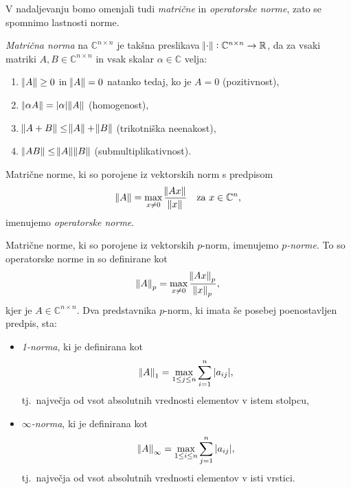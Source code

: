 \documentclass[mat1]{fmfdelo}
\newcommand{\R}{\mathbb R}
\newcommand{\C}{\mathbb C}
\begin{document}
V nadaljevanju bomo omenjali tudi \emph{matrične} in \emph{operatorske norme}, zato se spomnimo lastnosti norme.
\begin{definicija}
    \emph{Matrična norma} na $\C^{n \times n}$ je takšna preslikava $\norm{\cdot}: \C^{n \times n} \rightarrow \R$, da za vsaki matriki $A, B \in \C^{n \times n}$ in vsak skalar $\alpha \in \C$ velja:
    \begin{enumerate}
        \item $\norm{A} \geq 0$ in $\norm{A} = 0$ natanko tedaj, ko je $A = 0$ (pozitivnost),
        \item $\norm{\alpha A} = |\alpha|\norm{A}$ (homogenost),
        \item $\norm{A + B} \leq \norm{A} + \norm{B}$ (trikotniška neenakost), 
        \item $\norm{A B} \leq \norm{A} \norm{B}$ (submultiplikativnost).
    \end{enumerate}
    Matrične norme, ki so porojene iz vektorskih norm s predpisom
    \begin{equation*}
        \norm{A} = \max_{x \neq 0} \frac{\norm{A x}}{\norm{x}}\quad \text{za}\ x\in \C^n,
    \end{equation*}
    imenujemo \emph{operatorske norme}.
\end{definicija}
\begin{zgled}
    Matrične norme, ki so porojene iz vektorskih $p$-norm, imenujemo \emph{$p$-norme}. To so operatorske norme in so definirane kot
    \begin{equation*}
        \norm{A}_p = \max_{x \neq 0} \frac{\norm{A x}_p}{\norm{x}_p},
    \end{equation*}
    kjer je $A \in \C^{n\times n}$. Dva predstavnika $p$-norm, ki imata še posebej poenostavljen predpis, sta:
    \begin{itemize}
        \item \emph{1-norma}, ki je definirana kot
        \begin{equation*}
            \norm{A}_1 = \max_{1 \leq j \leq n} \sum_{i=1}^n |a_{ij}|,
        \end{equation*}
        tj.\ največja od vsot absolutnih vrednosti elementov v istem stolpcu,
        \item \emph{$\infty$-norma}, ki je definirana kot
        \begin{equation*}
            \norm{A}_\infty = \max_{1 \leq i \leq n} \sum_{j=1}^n |a_{ij}|,
        \end{equation*}
        tj.\ največja od vsot absolutnih vrednosti elementov v isti vrstici. \qedhere
    \end{itemize}
\end{zgled}
\end{document}
